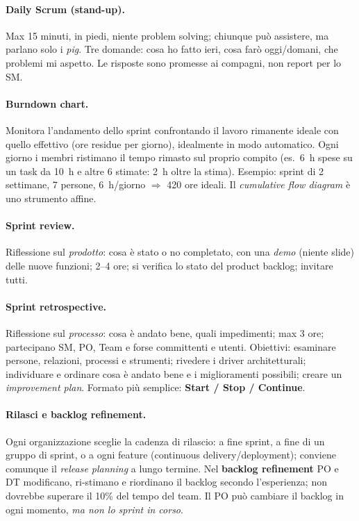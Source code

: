 \documentclass[a4paper,12pt]{article}
\begin{document}
\paragraph{Daily Scrum (stand-up).} Max 15 minuti, in piedi, niente problem solving;
chiunque può assistere, ma parlano solo i \emph{pig}. Tre domande: cosa ho fatto ieri,
cosa farò oggi/domani, che problemi mi aspetto. Le risposte sono promesse ai compagni, non
report per lo SM.

\paragraph{Burndown chart.} Monitora l'andamento dello sprint confrontando il lavoro
rimanente ideale con quello effettivo (ore residue per giorno), idealmente in modo
automatico. Ogni giorno i membri ristimano il tempo rimasto sul proprio compito (es.\
6~h spese su un task da 10~h e altre 6 stimate: 2~h oltre la stima). Esempio: sprint di 2
settimane, 7 persone, 6~h/giorno $\Rightarrow$ 420 ore ideali. Il \emph{cumulative flow
diagram} è uno strumento affine.

\paragraph{Sprint review.} Riflessione sul \emph{prodotto}: cosa è stato o no completato,
con una \emph{demo} (niente slide) delle nuove funzioni; 2--4 ore; si verifica lo stato
del product backlog; invitare tutti.

\paragraph{Sprint retrospective.} Riflessione sul \emph{processo}: cosa è andato bene,
quali impedimenti; max 3 ore; partecipano SM, PO, Team e forse committenti e utenti.
Obiettivi: esaminare persone, relazioni, processi e strumenti; rivedere i driver
architetturali; individuare e ordinare cosa è andato bene e i miglioramenti possibili;
creare un \emph{improvement plan}. Formato più semplice: \textbf{Start / Stop /
Continue}.

\paragraph{Rilasci e backlog refinement.} Ogni organizzazione sceglie la cadenza di
rilascio: a fine sprint, a fine di un gruppo di sprint, o a ogni feature (continuous
delivery/deployment); conviene comunque il \emph{release planning} a lungo termine. Nel
\textbf{backlog refinement} PO e DT modificano, ri-stimano e riordinano il backlog
secondo l'esperienza; non dovrebbe superare il 10\% del tempo del team. Il PO può
cambiare il backlog in ogni momento, \emph{ma non lo sprint in corso}.
\end{document}

